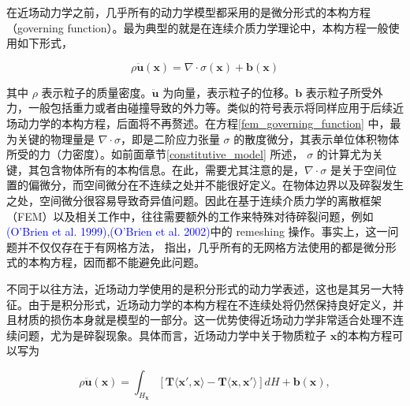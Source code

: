 在近场动力学之前，几乎所有的动力学模型都采用的是微分形式的本构方程（governing function）。最为典型的就是在连续介质力学理论中，本构方程一般使用如下形式，

\begin{equation}
\label{fem_governing_function}
\rho\ddot{\mathbf{u}}(\mathbf{x}) = \nabla\cdot\sigma(\mathbf{x})+\mathbf{b}(\mathbf{x})
\end{equation}

其中 $\rho$ 表示粒子的质量密度。$\ddot{\mathbf{u}}$ 为向量，表示粒子的位移。$\mathbf{b}$ 表示粒子所受外力，一般包括重力或者由碰撞导致的外力等。类似的符号表示将同样应用于后续近场动力学的本构方程，后面将不再赘述。在方程\ref{fem_governing_function} 中，最为关键的物理量是 $\nabla\cdot\sigma$，即是二阶应力张量 $\sigma$ 的散度微分，其表示单位体积物体所受的力（力密度）。如前面章节\ref{constitutive_model} 所述， $\sigma$ 的计算尤为关键，其包含物体所有的本构信息。在此，需要尤其注意的是，$\nabla\cdot\sigma$ 是关于空间位置的偏微分，而空间微分在不连续之处并不能很好定义。在物体边界以及碎裂发生之处，空间微分很容易导致奇异值问题。因此在基于连续介质力学的离散框架（FEM）以及相关工作中，往往需要额外的工作来特殊对待碎裂问题，例如\textcolor{blue}{(O'Brien et al. 1999)\parencite{OBrien1999}},\textcolor{blue}{(O'Brien et al. 2002)\parencite{OBrien2002}}中的 remeshing 操作。事实上，这一问题并不仅仅存在于有网格方法， 指出，几乎所有的无网格方法使用的都是微分形式的本构方程，因而都不能避免此问题。

不同于以往方法，近场动力学使用的是积分形式的动力学表述，这也是其另一大特征。由于是积分形式，近场动力学的本构方程在不连续处将仍然保持良好定义，并且材质的损伤本身就是模型的一部分。这一优势使得近场动力学非常适合处理不连续问题，尤为是碎裂现象。具体而言，近场动力学中关于物质粒子 $\mathbf{x}$的本构方程可以写为

\begin{equation}
\rho\ddot{\mathbf{u}}(\mathbf{x}) = \int_{H_\mathbf{x}}[\mathbf{T}\langle\mathbf{x}',\mathbf{x}\rangle - \mathbf{T}\langle\mathbf{x},\mathbf{x}'\rangle]dH+\mathbf{b}(\mathbf{x}),
\label{pdm_governing_function}
\end{equation}

